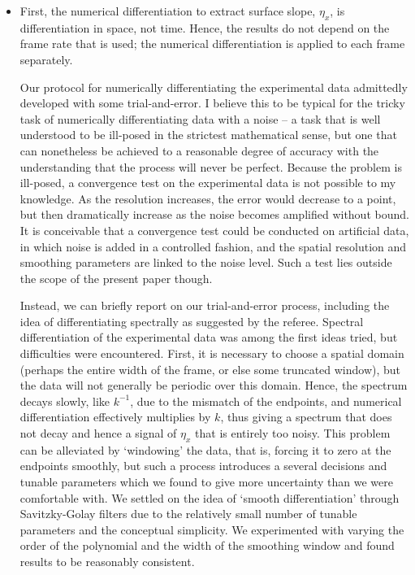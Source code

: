 \documentclass[11pt]{article}
\begin{document}
\begin{itemize}
\item First, the numerical differentiation to extract surface slope, $\eta_x$, is differentiation in space, not time. Hence, the results do not depend on the frame rate that is used; the numerical differentiation is applied to each frame separately.

Our protocol for numerically differentiating the experimental data admittedly developed with some trial-and-error. I believe this to be typical for the tricky task of numerically differentiating data with a noise -- a task that is well understood to be ill-posed in the strictest mathematical sense, but one that can nonetheless be achieved to a reasonable degree of accuracy with the understanding that the process will never be perfect. Because the problem is ill-posed, a convergence test on the experimental data is not possible to my knowledge. As the resolution increases, the error would decrease to a point, but then dramatically increase as the noise becomes amplified without bound. It is conceivable that a convergence test could be conducted on artificial data, in which noise is added in a controlled fashion, and the spatial resolution and smoothing parameters are linked to the noise level. Such a test lies outside the scope of the present paper though.

Instead, we can briefly report on our trial-and-error process, including the idea of differentiating spectrally as suggested by the referee. Spectral differentiation of the experimental data was among the first ideas tried, but difficulties were encountered. First, it is necessary to choose a spatial domain (perhaps the entire width of the frame, or else some truncated window), but the data will not generally be periodic over this domain. Hence, the spectrum decays slowly, like $k^{-1}$, due to the mismatch of the endpoints, and numerical differentiation effectively multiplies by $k$, thus giving a spectrum that does not decay and hence a signal of $\eta_x$ that is entirely too noisy. This problem can be alleviated by `windowing' the data, that is, forcing it to zero at the endpoints smoothly, but such a process introduces a several decisions and tunable parameters which we found to give more uncertainty than we were comfortable with. We settled on the idea of `smooth differentiation' through Savitzky-Golay filters due to the relatively small number of tunable parameters and the conceptual simplicity. We experimented with varying the order of the polynomial and the width of the smoothing window and found results to be reasonably consistent.
\end{itemize}
\end{document}
